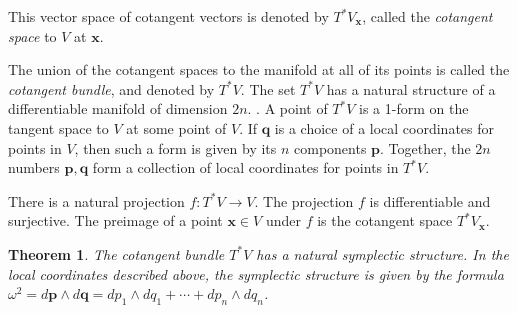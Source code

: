 \documentclass[leqno]{report}
\numberwithin{equation}{section}
\theoremstyle{plain}
\newtheorem*{thm*}{Theorem}
\theoremstyle{definition}
\theoremstyle{remark}
\theoremstyle{smallcap}
\numberwithin{prob}{section}
\begin{document}
This vector space of cotangent vectors is denoted by $T^*V_{\mathbf x}$,
called the \emph{cotangent space} to $V$ at $\mathbf x$.

The union of the cotangent spaces to the manifold at all of its points
is called the \emph{cotangent bundle}, and denoted by $T^*V$.
%
The set $T^*V$ has a natural structure of a differentiable manifold of
dimension $2 n$.
.
%
A point of $T^*V$ is a 1-form on the tangent space to $V$ at some point of $V$.
%
If $\mathbf q$ is a choice of a local coordinates for points in $V$,
then such a form is given by its $n$ components $\mathbf p$.
%
Together, the $2n$ numbers $\mathbf p, \mathbf q$ form a collection of local coordinates
for points in $T^*V$.


There is a natural projection
$f: T^*V \to V$.
%
The projection $f$ is differentiable and surjective.
%
The preimage of a point $\mathbf x \in V$ under $f$
is the cotangent space $T^*V_{\mathbf x}$.


\begin{thm*}
The cotangent bundle $T^*V$ has a natural symplectic structure.
%
In the local coordinates described above,
the symplectic structure is given by the formula
$\omega^2 = d\mathbf p \wedge d\mathbf q = dp_1 \wedge dq_1 + \cdots + dp_n \wedge dq_n$.
\end{thm*}
\end{document}
